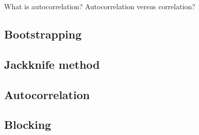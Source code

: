 What is autocorrelation? Autocorrelation versus correlation?
\subsection{Bootstrapping}
\subsection{Jackknife method}
\subsection{Autocorrelation}
\subsection{Blocking}